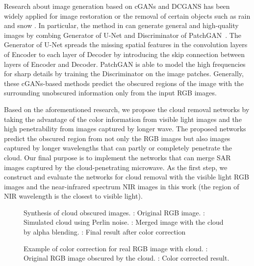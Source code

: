 \documentclass[10pt,twocolumn,letterpaper]{article}
\begin{document}
Research about image generation based on cGANs and DCGANS has been widely applied for image restoration or the removal of certain objects such as rain and snow \cite{pathak2016context,zhang2017image}. In particular, the method in \cite{isola2016image} can generate general and high-quality images by combing Generator of U-Net \cite{ronneberger2015u} and  Discriminator of PatchGAN~\cite{li2016precomputed}. The Generator of U-Net spreads the missing spatial features in the convolution layers of Encoder to each layer of Decoder by introducing the skip connection between layers of Encoder and Decoder. PatchGAN is able to model the high frequencies for sharp details by training the Discriminator on the image patches. Generally, these cGANs-based methods predict the obscured regions of the image with the surrounding unobscured information only from the input RGB images. 

Based on the aforementioned research, we propose the cloud removal networks by taking the advantage of the color information from visible light images and the high penetrability from images captured by longer wave. The proposed networks predict the obscured region from not only the RGB images but also images captured by longer wavelengths that can partly or completely penetrate the cloud. Our final purpose is to implement the networks that can merge SAR images  captured by the cloud-penetrating microwave. As the first step, we construct and evaluate the networks for cloud removal with the visible light RGB images and the near-infrared spectrum NIR images in this work (the region of NIR  wavelength is the closest to visible light). 

\begin{figure*}[!t]
\begin{center}


\caption{Synthesis of cloud obscured images. \protect{}: Original RGB image. \protect{}: Simulated cloud using Perlin noise. \protect{}: Merged image with the cloud by alpha blending. \protect{}: Final result after color correction}
\label{fig:synthesis}

\end{center}
\end{figure*}

\begin{figure}[!t]
\begin{center}



\caption{Example of color correction for real RGB image with cloud. \protect{}: Original RGB image obscured by the cloud. \protect{}: Color corrected result.}
\label{fig:synthesis_colorcorrect}

\end{center}
\end{figure}
\end{document}
